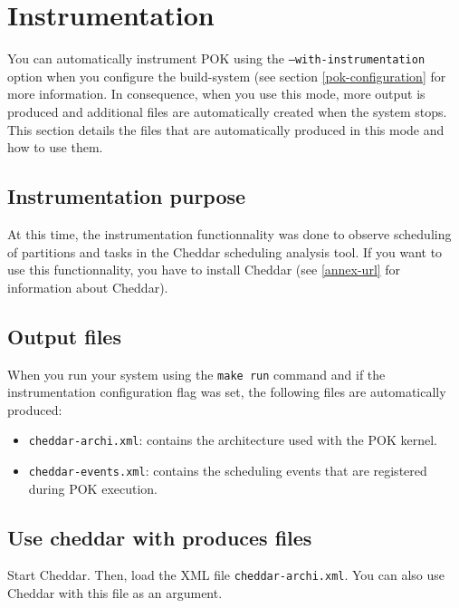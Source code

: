 %
%
%
%
%

\chapter{Instrumentation}
\label{chapter-instrumentation}
You can automatically instrument POK using the \texttt{--with-instrumentation} option when 
you configure the build-system (see section \ref{pok-configuration} for more information.
In consequence, when you use this mode, more output is produced and additional files are automatically created when
the system stops. This section details the files that are automatically produced in this mode and how to use them.

   \section{Instrumentation purpose}
   At this time, the instrumentation functionnality was done to observe scheduling of partitions and tasks
   in the Cheddar scheduling analysis tool. If you want to use this functionnality, you have to install Cheddar (see \ref{annex-url}
   for information about Cheddar).

   \section{Output files}
   When you run your system using the \texttt{make run} command and if the instrumentation configuration flag was set, the following files are
   automatically produced:
   \begin{itemize}
      \item
         \texttt{cheddar-archi.xml}: contains the architecture used with the POK kernel.
      \item
         \texttt{cheddar-events.xml}: contains the scheduling events that are registered during POK execution.
   \end{itemize}

   \section{Use cheddar with produces files}
   Start Cheddar. Then, load the XML file \texttt{cheddar-archi.xml}. You can also use Cheddar with this file as an argument.

